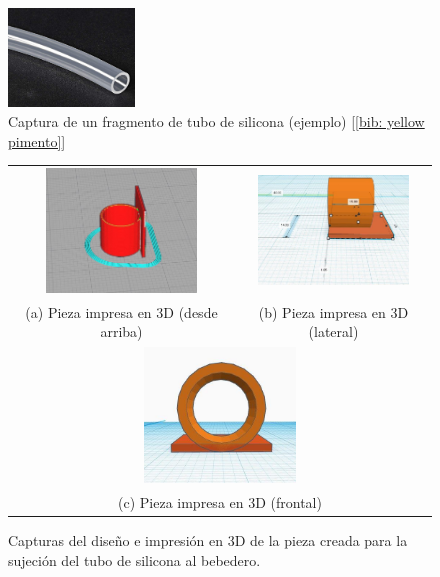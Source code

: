 \documentclass[12pt]{article}
\begin{document}
	\pagebreak
	
	
	\begin{figure}[h!]
		\begin{center}
			\includegraphics[width=0.30\textwidth]{img/tubo_silicona.png}
			\caption{Captura de un fragmento de tubo de silicona (ejemplo) [\ref{bib: yellow pimento}]}
			\label{Captura tubo silicona}
		\end{center}
	\end{figure}

	\begin{figure}[h]
		\begin{center}
			\begin{tabular}{cc}
				\includegraphics[width=40mm]{img/pieza_sujecion_1.jpg} &   \includegraphics[width=40mm]{img/pieza_sujecion_2.jpg} \\
				(a) Pieza impresa en 3D (desde arriba) & (b) Pieza impresa en 3D (lateral) \\[6pt]
				\multicolumn{2}{c}{\includegraphics[width=40mm]{img/pieza_sujecion_3.jpg} }\\
				\multicolumn{2}{c}{(c) Pieza impresa en 3D (frontal) }
			\end{tabular}
			\caption{Capturas del diseño e impresión en 3D de la pieza creada para la sujeción del tubo de silicona al bebedero. }
			\label{fig: pieza 3D sujecion bebedero.}
		\end{center}
	\end{figure}
	
\end{document}
